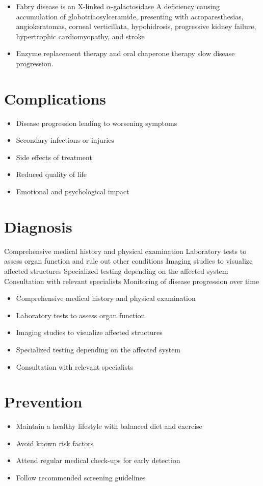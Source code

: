\begin{itemize}[noitemsep]
  \item Fabry disease is an X-linked $\alpha$-galactosidase A deficiency causing accumulation of globotriaosylceramide, presenting with acroparesthesias, angiokeratomas, corneal verticillata, hypohidrosis, progressive kidney failure, hypertrophic cardiomyopathy, and stroke
  \item Enzyme replacement therapy and oral chaperone therapy slow disease progression.
\end{itemize}
\section{Complications}
\begin{itemize}[noitemsep]
  \item Disease progression leading to worsening symptoms
  \item Secondary infections or injuries
  \item Side effects of treatment
  \item Reduced quality of life
  \item Emotional and psychological impact
\end{itemize}
\section{Diagnosis}
Comprehensive medical history and physical examination Laboratory tests to assess organ function and rule out other conditions Imaging studies to visualize affected structures Specialized testing depending on the affected system Consultation with relevant specialists Monitoring of disease progression over time

\begin{itemize}[noitemsep]
  \item Comprehensive medical history and physical examination
  \item Laboratory tests to assess organ function
  \item Imaging studies to visualize affected structures
  \item Specialized testing depending on the affected system
  \item Consultation with relevant specialists
\end{itemize}
\section{Prevention}
\begin{itemize}[noitemsep]
  \item Maintain a healthy lifestyle with balanced diet and exercise
  \item Avoid known risk factors
  \item Attend regular medical check-ups for early detection
  \item Follow recommended screening guidelines
\end{itemize}
